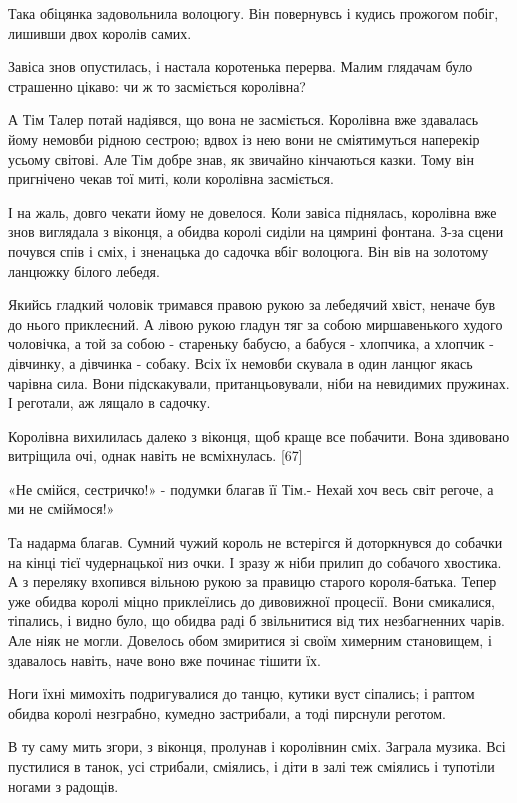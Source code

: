 Така обіцянка задовольнила волоцюгу. Він повернувсь і кудись прожогом побіг, лишивши двох королів самих.

Завіса знов опустилась, і настала коротенька перерва. Малим глядачам було страшенно цікаво: чи ж то засміється королівна?

А Тім Талер потай надіявся, що вона не засміється. Королівна вже здавалась йому немовби рідною сестрою; вдвох із нею вони не сміятимуться наперекір усьому світові. Але Тім добре знав, як звичайно кінчаються казки. Тому він пригнічено чекав тої миті, коли королівна засміється.

І на жаль, довго чекати йому не довелося. Коли завіса піднялась, королівна вже знов виглядала з віконця, а обидва королі сиділи на цямрині фонтана. З-за сцени почувся спів і сміх, і зненацька до садочка вбіг волоцюга. Він вів на золотому ланцюжку білого лебедя.

Якийсь гладкий чоловік тримався правою рукою за лебедячий хвіст, неначе був до нього приклеєний. А лівою рукою гладун тяг за собою миршавенького худого чоловічка, а той за собою - стареньку бабусю, а бабуся - хлопчика, а хлопчик - дівчинку, а дівчинка - собаку. Всіх їх немовби скувала в один ланцюг якась чарівна сила. Вони підскакували, пританцьовували, ніби на невидимих пружинах. І реготали, аж лящало в садочку.

Королівна вихилилась далеко з віконця, щоб краще все побачити. Вона здивовано витріщила очі, однак навіть не всміхнулась. [67]

«Не смійся, сестричко!» - подумки благав її Тім.- Нехай хоч весь світ регоче, а ми не сміймося!»

Та надарма благав. Сумний чужий король не встерігся й доторкнувся до собачки на кінці тієї чудернацької низ очки. І зразу ж ніби прилип до собачого хвостика. А з переляку вхопився вільною рукою за правицю старого короля-батька. Тепер уже обидва королі міцно приклеїлись до дивовижної процесії. Вони смикалися, тіпались, і видно було, що обидва раді б звільнитися від тих незбагненних чарів. Але ніяк не могли. Довелось обом змиритися зі своїм химерним становищем, і здавалось навіть, наче воно вже починає тішити їх.

Ноги їхні мимохіть подригувалися до танцю, кутики вуст сіпались; і раптом обидва королі незграбно, кумедно застрибали, а тоді пирснули реготом.

В ту саму мить згори, з віконця, пролунав і королівнин сміх. Заграла музика. Всі пустилися в танок, усі стрибали, сміялись, і діти в залі теж сміялись і тупотіли ногами з радощів.

